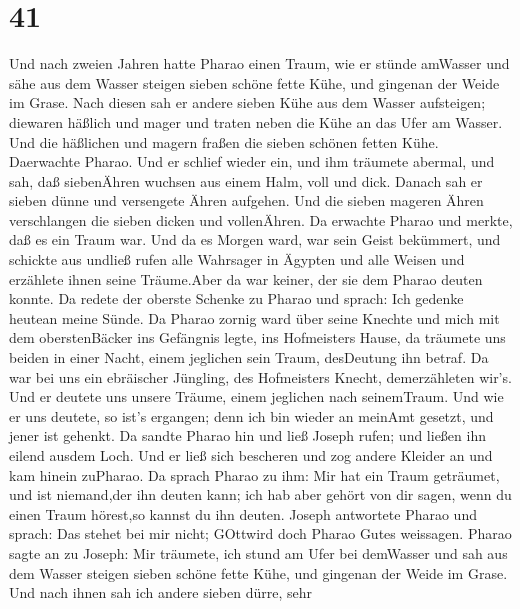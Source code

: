 \hypertarget{section-40}{%
\section{41}\label{section-40}}

 Und nach zweien Jahren hatte Pharao einen Traum, wie er
stünde amWasser  und sähe aus dem Wasser steigen sieben
schöne fette Kühe, und gingenan der Weide im Grase.  Nach
diesen sah er andere sieben Kühe aus dem Wasser aufsteigen; diewaren
häßlich und mager und traten neben die Kühe an das Ufer am Wasser.
 Und die häßlichen und magern fraßen die sieben schönen
fetten Kühe. Daerwachte Pharao.  Und er schlief wieder ein,
und ihm träumete abermal, und sah, daß siebenÄhren wuchsen aus einem
Halm, voll und dick.  Danach sah er sieben dünne und
versengete Ähren aufgehen.  Und die sieben mageren Ähren
verschlangen die sieben dicken und vollenÄhren. Da erwachte Pharao und
merkte, daß es ein Traum war.  Und da es Morgen ward, war
sein Geist bekümmert, und schickte aus undließ rufen alle Wahrsager in
Ägypten und alle Weisen und erzählete ihnen seine Träume.Aber da war
keiner, der sie dem Pharao deuten konnte.  Da redete der
oberste Schenke zu Pharao und sprach: Ich gedenke heutean meine Sünde.
 Da Pharao zornig ward über seine Knechte und mich mit dem
oberstenBäcker ins Gefängnis legte, ins Hofmeisters Hause, 
da träumete uns beiden in einer Nacht, einem jeglichen sein Traum,
desDeutung ihn betraf.  Da war bei uns ein ebräischer
Jüngling, des Hofmeisters Knecht, demerzähleten wir's. Und er deutete
uns unsere Träume, einem jeglichen nach seinemTraum.  Und
wie er uns deutete, so ist's ergangen; denn ich bin wieder an meinAmt
gesetzt, und jener ist gehenkt.  Da sandte Pharao hin und
ließ Joseph rufen; und ließen ihn eilend ausdem Loch. Und er ließ sich
bescheren und zog andere Kleider an und kam hinein zuPharao.
 Da sprach Pharao zu ihm: Mir hat ein Traum geträumet, und
ist niemand,der ihn deuten kann; ich hab aber gehört von dir sagen, wenn
du einen Traum hörest,so kannst du ihn deuten.  Joseph
antwortete Pharao und sprach: Das stehet bei mir nicht; GOttwird doch
Pharao Gutes weissagen.  Pharao sagte an zu Joseph: Mir
träumete, ich stund am Ufer bei demWasser  und sah aus dem
Wasser steigen sieben schöne fette Kühe, und gingenan der Weide im
Grase.  Und nach ihnen sah ich andere sieben dürre, sehr
